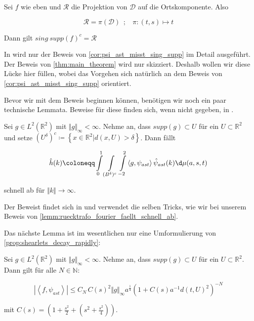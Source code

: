 \begin{corollary}
\label{cor:psi_ast_misst_sing_supp}
Sei $f$ wie eben und $\mathcal{R}$ die Projektion von $\mathcal{D}$ auf die  Ortskomponente. Also

\begin{equation*}
    \mathcal{R} = \pi (\mathcal{D})~~;~~~~
    \pi : (t,s) \mapsto t
\end{equation*}

Dann gilt $sing ~supp (f)^c = \mathcal{R}$
\end{corollary}

In \cite{Kutyniok2008} wird nur der Beweis von \cref{cor:psi_ast_misst_sing_supp} im Detail ausgeführt. Der Beweis von \cref{thm:main_theorem} wird nur skizziert. Deshalb wollen wir diese Lücke hier füllen, wobei das Vorgehen sich natürlich an dem Beweis von \cref{cor:psi_ast_misst_sing_supp} orientiert.

Bevor wir mit dem Beweis beginnen können, benötigen wir noch ein paar technische Lemmata. Beweise für diese finden sich, wenn nicht gegeben, in \cite{Kutyniok2008}.

\begin{lemma}
\label{lemm:lemma54}
    Sei $g \in L^2(\mathbb{R}^2)$ mit $\Vert g\Vert_\infty < \infty$. Nehme an, dass $supp (g) \subset U$ für ein $U \subset \mathbb{R}^2$ und setze
    $(U^\delta)^c \coloneqq \left\{x \in \mathbb{R}^2 | d(x,U) > \delta\right\}$.
    Dann fällt

    \begin{equation*}
        \hat h(k) \coloneqq \int \limits_0^1 \int \limits_{(B^\delta)^c} \int \limits_{-2}^{2} \left<g,\psi_{ast}\right> \hat \psi_{ast}(k) \d \mu (a,s,t)
    \end{equation*}

    schnell ab für $\Vert k \Vert \to \infty$.
\end{lemma}

Der Beweist findet sich in \cite{Kutyniok2008} und verwendet die selben Tricks, wie wir bei unserem Beweis von \cref{lemm:ruecktrafo_fourier_faellt_schnell_ab}.

Das nächste Lemma ist im wesentlichen nur eine Umformulierung von \cref{prop:shearlets_decay_rapidly}:

\begin{lemma}
\label{lemm:lemma52}
    Sei $g \in L^2(\mathbb{R}^2)$ mit $\Vert g\Vert_\infty < \infty$. Nehme an, dass $supp (g) \subset U$ für ein $U \subset \mathbb{R}^2$.
    Dann gilt für alle \(N \in \mathbb{N}\):

    \begin{equation*}
    |\left\langle f, \psi_{ast}\right\rangle| \leq C_N\, C(s)^2 \Vert g\Vert_\infty a^{\frac{1}{4}} \left(1+C(s) a^{-1} d(t,U)^2\right)^{-N}
    \end{equation*}

    mit \( C(s) = \left(1+\frac{s^2}{2} + \left(s^2+\frac{s^2}{4}\right)\right)\).
\end{lemma}

